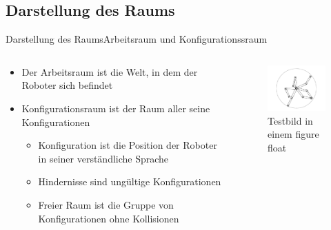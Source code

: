 \documentclass[t,aspectratio=169,dvipsnames]{beamer}
\begin{document}
\subsection{Darstellung des Raums}
\begin{frame}{Darstellung des Raums}{Arbeitsraum und Konfigurationssraum}
	\begin{columns}
		\begin{column}[T]{0.6\textwidth}
			\begin{itemize}
				\item Der Arbeitsraum ist die Welt, in dem der Roboter sich befindet\newline
				\item Konfigurationsraum ist der Raum aller seine Konfigurationen
				\begin{itemize}
					\item Konfiguration ist die Position der Roboter in seiner verständliche Sprache
					\item Hindernisse sind ungültige Konfigurationen
					\item Freier Raum ist die Gruppe von Konfigurationen ohne Kollisionen
					
				\end{itemize}
			\end{itemize}
		\end{column}
		\begin{column}[T]{0.4\textwidth}
			\begin{figure}
				\includegraphics[width=4.5cm]{images/Bild2.png}
				\caption{Testbild in einem figure float} 
			\end{figure}
		\end{column}
	\end{columns}
\end{frame}
\end{document}
